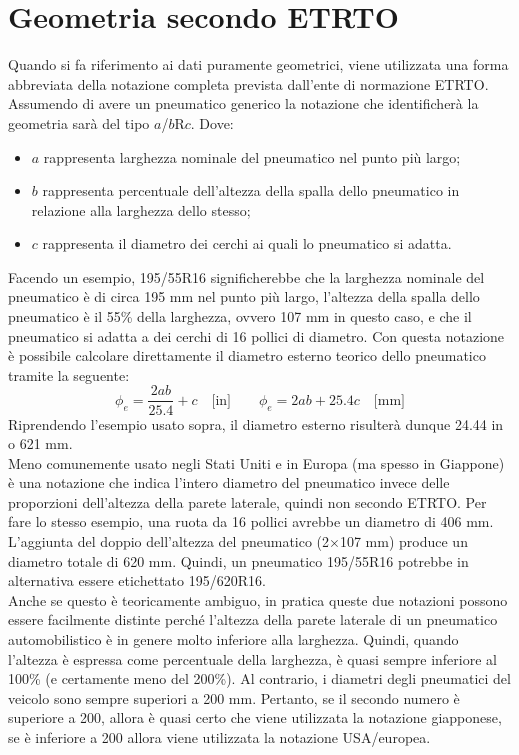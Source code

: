 \section{Geometria secondo ETRTO}
Quando si fa riferimento ai dati puramente geometrici, viene utilizzata una forma abbreviata della notazione completa prevista dall'ente di normazione \ac{ETRTO}. Assumendo di avere un pneumatico generico la notazione che identificherà la geometria sarà del tipo $a$/$b$R$c$. Dove:
\begin{itemize}
	\item $a$ rappresenta larghezza nominale del pneumatico nel punto più largo;
	\item $b$ rappresenta percentuale dell'altezza della spalla dello pneumatico in relazione alla larghezza dello stesso;
	\item $c$ rappresenta il diametro dei cerchi ai quali lo pneumatico si adatta.
\end{itemize}
Facendo un esempio, 195/55R16 significherebbe che la larghezza nominale del pneumatico è di circa 195 mm nel punto più largo, l'altezza della spalla dello pneumatico è il 55\% della larghezza, ovvero 107 mm in questo caso, e che il pneumatico si adatta a dei cerchi di 16 pollici di diametro. Con questa notazione è possibile calcolare direttamente il diametro esterno teorico dello pneumatico tramite la seguente:
%
\begin{equation}
	\phi_e = \frac{2ab}{25.4}+c \quad \text{[in]} \qquad
	\phi_e = 2ab+25.4c \quad \text{[mm]}
\end{equation}
%
Riprendendo l'esempio usato sopra, il diametro esterno risulterà dunque 24.44 in o 621 mm.\\
Meno comunemente usato negli Stati Uniti e in Europa (ma spesso in Giappone) è una notazione che indica l'intero diametro del pneumatico invece delle proporzioni dell'altezza della parete laterale, quindi non secondo \ac{ETRTO}. Per fare lo stesso esempio, una ruota da 16 pollici avrebbe un diametro di 406 mm. L'aggiunta del doppio dell'altezza del pneumatico (2$\times$107 mm) produce un diametro totale di 620 mm. Quindi, un pneumatico 195/55R16 potrebbe in alternativa essere etichettato 195/620R16.\\
Anche se questo è teoricamente ambiguo, in pratica queste due notazioni possono essere facilmente distinte perché l'altezza della parete laterale di un pneumatico automobilistico è in genere molto inferiore alla larghezza. Quindi, quando l'altezza è espressa come percentuale della larghezza, è quasi sempre inferiore al 100\% (e certamente meno del 200\%). Al contrario, i diametri degli pneumatici del veicolo sono sempre superiori a 200 mm. Pertanto, se il secondo numero è superiore a 200, allora è quasi certo che viene utilizzata la notazione giapponese, se è inferiore a 200 allora viene utilizzata la notazione USA/europea.

